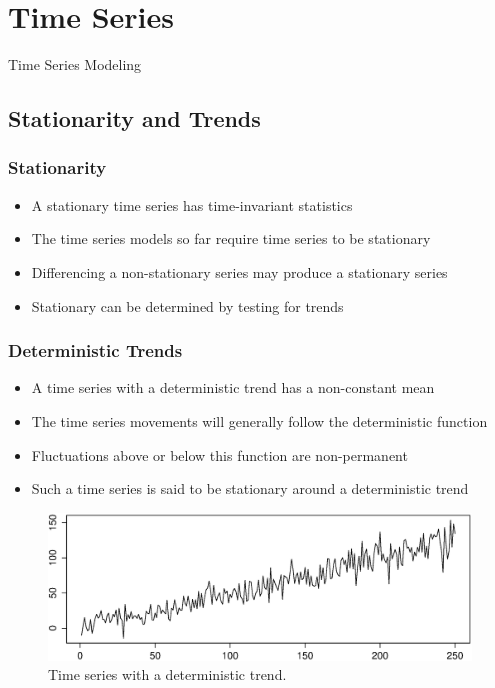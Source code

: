 \documentclass[presentation]{beamer}
\begin{document}
\section{Time Series}

\begin{frame}
\begin{center}
\Large{Time Series Modeling}
\end{center}
\end{frame}



\subsection{Stationarity and Trends}

\begin{frame}[t]
\frametitle{Stationarity}
\begin{itemize}
\item{A stationary time series has time-invariant statistics}
\item{The time series models so far require time series to be stationary}
\item{Differencing a non-stationary series may produce a stationary series}
\item{Stationary can be determined by testing for trends}
\end{itemize}
\end{frame}

\begin{frame}[t]
\frametitle{Deterministic Trends}
\footnotesize{
\begin{itemize}
\item{A time series with a deterministic trend has a non-constant mean}
\item{The time series movements will generally follow the deterministic function}
\item{Fluctuations above or below this function are non-permanent}
\item{Such a time series is said to be stationary around a deterministic trend}
\end{itemize}
}
\begin{figure}[htbp]
\begin{center}
\includegraphics[width=\textwidth]{assets/deterministic_trend.eps}
\caption{Time series with a deterministic trend.}
\end{center}
\end{figure}
\end{frame}
\end{document}
